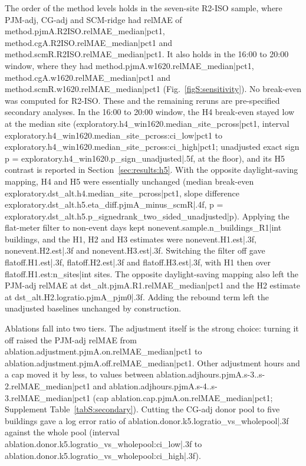 The order of the method levels holds in the seven-site R2-ISO sample, where PJM-adj, CG-adj and SCM-ridge had relMAE of {{method.pjmA.R2ISO.relMAE_median|pct1}}, {{method.cgA.R2ISO.relMAE_median|pct1}} and {{method.scmR.R2ISO.relMAE_median|pct1}}. It also holds in the 16:00 to 20:00 window, where they had {{method.pjmA.w1620.relMAE_median|pct1}}, {{method.cgA.w1620.relMAE_median|pct1}} and {{method.scmR.w1620.relMAE_median|pct1}} (Fig.~\ref{figS:sensitivity}). No break-even was computed for R2-ISO. These and the remaining reruns are pre-specified secondary analyses. In the 16:00 to 20:00 window, the H4 break-even stayed low at the median site ({{exploratory.h4_win1620.median_site_pcross|pct1}}, interval {{exploratory.h4_win1620.median_site_pcross:ci_low|pct1}} to {{exploratory.h4_win1620.median_site_pcross:ci_high|pct1}}; unadjusted exact sign p = {{exploratory.h4_win1620.p_sign_unadjusted|.5f}}, at the floor), and its H5 contrast is reported in Section~\ref{sec:results:h5}. With the opposite daylight-saving mapping, H4 and H5 were essentially unchanged (median break-even {{exploratory.dst_alt.h4.median_site_pcross|pct1}}, slope difference {{exploratory.dst_alt.h5.eta_diff.pjmA_minus_scmR|.4f}}, p = {{exploratory.dst_alt.h5.p_signedrank_two_sided_unadjusted|p}}). Applying the flat-meter filter to non-event days kept {{nonevent.sample.n_buildings_R1|int}} buildings, and the H1, H2 and H3 estimates were {{nonevent.H1.est|.3f}}, {{nonevent.H2.est|.3f}} and {{nonevent.H3.est|.3f}}. Switching the filter off gave {{flatoff.H1.est|.3f}}, {{flatoff.H2.est|.3f}} and {{flatoff.H3.est|.3f}}, with H1 then over {{flatoff.H1.est:n_sites|int}} sites. The opposite daylight-saving mapping also left the PJM-adj relMAE at {{dst_alt.pjmA.R1.relMAE_median|pct1}} and the H2 estimate at {{dst_alt.H2.logratio.pjmA_pjm0|.3f}}. Adding the rebound term left the unadjusted baselines unchanged by construction.

Ablations fall into two tiers. The adjustment itself is the strong choice: turning it off raised the PJM-adj relMAE from {{ablation.adjustment.pjmA.on.relMAE_median|pct1}} to {{ablation.adjustment.pjmA.off.relMAE_median|pct1}}. Other adjustment hours and a cap moved it by less, to values between {{ablation.adjhours.pjmA.s-3..s-2.relMAE_median|pct1}} and {{ablation.adjhours.pjmA.s-4..s-3.relMAE_median|pct1}} (cap {{ablation.cap.pjmA.on.relMAE_median|pct1}}; Supplement Table~\ref{tabS:secondary}). Cutting the CG-adj donor pool to five buildings gave a log error ratio of {{ablation.donor.k5.logratio_vs_wholepool|.3f}} against the whole pool (interval {{ablation.donor.k5.logratio_vs_wholepool:ci_low|.3f}} to {{ablation.donor.k5.logratio_vs_wholepool:ci_high|.3f}}).

